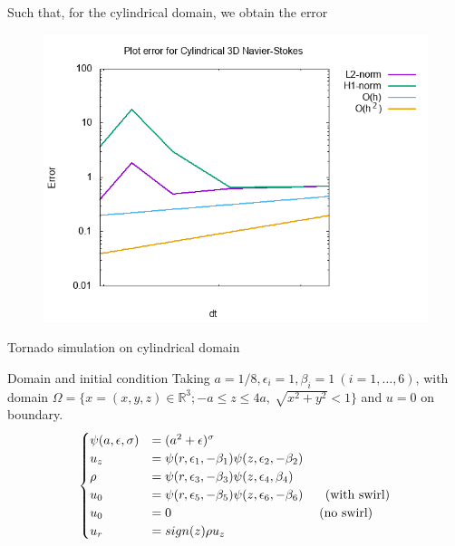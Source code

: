\documentclass{beamer}
\newcommand{\R}{\mathbb{R}}
\begin{document}
\begin{frame}
Such that, for the cylindrical domain, we obtain the error
\begin{figure}
	\centering
	\includegraphics[width=1\linewidth]{NS_3D/error_cyl_2}
	\caption{}
	\label{fig:errorcyl2}
\end{figure}

\end{frame}

\begin{frame}{Tornado simulation on cylindrical domain}
	\begin{block}{Domain and initial condition}
		Taking $ a=1/8, \epsilon_{i} =1, \beta_{i}=1 \ (i=1,\dots,6) $, with domain $ \Omega = \{ x=(x,y,z) \in \R^3 ; -a\leq z\leq 4a, \ \sqrt{x^2+y^2}<1 \} $ and $ u=0 $ on boundary.
		\begin{equation}\label{initial}
		\begin{cases}
		\psi(a,\epsilon,\sigma) &= (a^{2}+\epsilon)^{\sigma}\\
		u_{z} &= \psi(r,\epsilon_{1},-\beta_{1})\psi(z,\epsilon_{2},-\beta_{2})\\ 
		\rho &= \psi(r,\epsilon_{3},-\beta_{3})\psi(z,\epsilon_{4},\beta_{4})\\ 
		u_{0} &= \psi(r,\epsilon_{5},-\beta_{5})\psi(z,\epsilon_{6},-\beta_{6}) \text{\hspace{0.5cm} (with swirl)}\\
		u_{0} &= 0 \text{ \hspace{4cm}(no swirl) }\\
		u_{r} &= sign(z)\rho u_{z}
		\end{cases}
		\end{equation}
	\end{block}
\end{frame}
\end{document}
